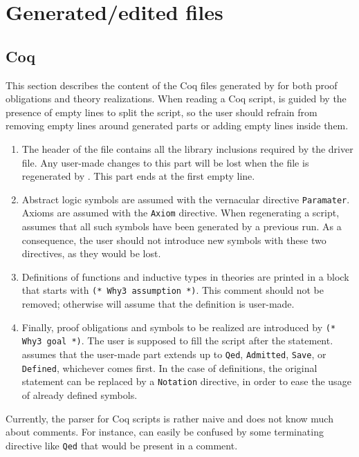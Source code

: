 \section{Generated/edited files}

\subsection{Coq}

This section describes the content of the Coq files generated by \why for
both proof obligations and theory realizations. When reading a Coq
script, \why is guided by the presence of empty lines to split the
script, so the user should refrain from removing empty lines around
generated parts or adding empty lines inside them.

\begin{enumerate}
\item	The header of the file contains all the library inclusions
	required by the driver file. Any user-made changes to this part
	will be lost when the file is regenerated by \why. This part ends
	at the first empty line.
\item	Abstract logic symbols are assumed with the vernacular directive
	\verb+Paramater+. Axioms are assumed with the \verb+Axiom+
	directive. When regenerating a script, \why assumes that all such
	symbols have been generated by a previous run. As a consequence,
	the user should not introduce new symbols with these two
	directives, as they would be lost.
\item	Definitions of functions and inductive types in theories are
	printed in a block that starts with \verb+(* Why3 assumption *)+.
	This comment should not be removed; otherwise \why will assume
	that the definition is user-made.
\item	Finally, proof obligations and symbols to be realized are
	introduced by \verb+(* Why3 goal *)+. The user is supposed to
	fill the script after the statement. \why assumes that the
	user-made part extends up to \verb+Qed+, \verb+Admitted+,
	\verb+Save+, or \verb+Defined+, whichever comes first. In the
	case of definitions, the original statement can be replaced by
	a \verb+Notation+ directive, in order to ease the usage of
	already defined symbols.
\end{enumerate}

Currently, the parser for Coq scripts is rather naive and does not know
much about comments. For instance, \why can easily be confused by
some terminating directive like \verb+Qed+ that would be present in a
comment.

